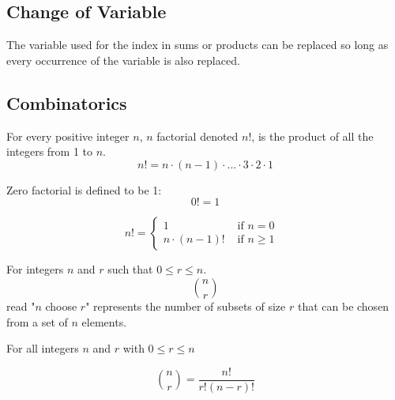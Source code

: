 \documentclass[11pt]{article}
\begin{document}
\subsection{Change of Variable}

The variable used for the index in sums or products can be replaced so long
as every occurrence of the variable is also replaced.

\subsection{Combinatorics}

\begin{definition}[Factorial]\label{def:factorial}
    For every positive integer $n$, $n$ factorial denoted $n!$,
    is the product of all the integers from 1 to $n$.
    \begin{equation*}
        n! = n \cdot (n - 1) \cdot ... \cdot 3 \cdot 2 \cdot 1
    \end{equation*}
    
    Zero factorial is defined to be 1:
    \begin{equation*}
        0! = 1
    \end{equation*}
\end{definition}

\begin{definition}\label{def:factorial-recursive}
    \begin{equation*}
        n! = 
        \begin{cases}
            1  & \text{ if $n = 0$ } \\
            n \cdot (n - 1)! & \text{ if $n \geq 1$}
        \end{cases}
    \end{equation*}
\end{definition}

\begin{definition}\label{def:choose}
    For integers $n$ and $r$ such that $0 \leq r \leq n$.
    \begin{equation*}
        {n \choose r}
    \end{equation*}
    read "$n$ choose $r$" represents the number of subsets of size $r$ that
    can be chosen from a set of $n$ elements.
\end{definition}

\begin{definition}\label{def:combinations}
    For all integers $n$ and $r$ with $0 \leq r \leq n$

    \begin{equation*}
        {n \choose r} = \dfrac{n!}{r!(n - r)!}
    \end{equation*}
\end{definition}
\end{document}
